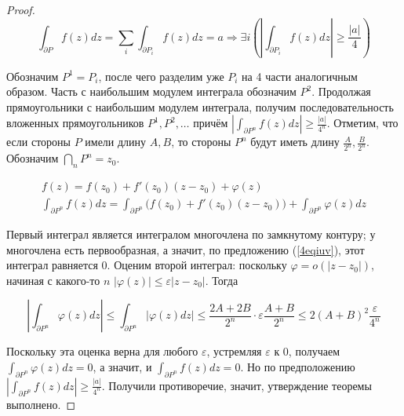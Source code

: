 \documentclass[12pt]{article}
\newcommand{\Ra}{\Rightarrow}
\theoremstyle{thmnote}
\theoremstyle{remark}
\theoremstyle{defnote}
\begin{document}
\begin{proof}
    \begin{equation*}
        \int_{\partial P} f(z)dz = \underset{i}{\sum} \int_{\partial P_i} f(z)dz = a \Ra \exists i \left( \left| \int_{\partial P_i} f(z)dz \right| \geq \frac{|a|}{4} \right) 
    \end{equation*}

    Обозначим $P^1 = P_i$, после чего разделим уже $P_i$ на 4 части аналогичным образом. Часть с наибольшим модулем интеграла обозначим $P^2$. Продолжая прямоугольники с наибольшим модулем интеграла, получим последовательность вложенных прямоугольников $P^1, P^2, \hdots$ причём $\left| \int_{\partial P^n} f(z)dz \right| \geq \frac{|a|}{4^n}$. Отметим, что если стороны $P$ имели длину $A, B$, то стороны $P^n$ будут иметь длину $\frac{A}{2^n}, \frac{B}{2^n}$. Обозначим $\bigcap_n P^n = z_0$.

    \begin{gather*}
        f(z) = f(z_0) + f'(z_0)(z - z_0) + \varphi(z) \\
        \int_{\partial P^n} f(z)dz = \int_{\partial P^n} \Big( f(z_0) + f'(z_0)(z - z_0) \Big) + \int_{\partial P^n} \varphi(z)dz
    \end{gather*}

    Первый интеграл является интегралом многочлена по замкнутому контуру; у многочлена есть первообразная, а значит, по предложению (\ref{4eqiuv}), этот интеграл равняется 0. Оценим второй интеграл: поскольку $\varphi = o(|z - z_0|)$, начиная с какого-то $n$ $|\varphi(z)| \leq \varepsilon |z - z_0|$. Тогда

    \begin{equation*}
        \left| \int_{\partial P^n} \varphi(z)dz \right| \leq \int_{\partial P^n} \left| \varphi(z)dz \right| \leq \frac{2A + 2B}{2^n} \cdot \varepsilon \frac{A+B}{2^n} \leq 2(A+B)^2 \frac{\varepsilon}{4^n}
    \end{equation*}

    Поскольку эта оценка верна для любого $\varepsilon$, устремляя $\varepsilon$ к 0, получаем $\int_{\partial P^n} \varphi(z)dz = 0$, а значит, и $\int_{\partial P^n} f(z)dz = 0$. Но по предположению $\left| \int_{\partial P^n} f(z)dz \right| \geq \frac{|a|}{4^n}$. Получили противоречие, значит, утверждение теоремы выполнено.

\end{proof}
\end{document}
